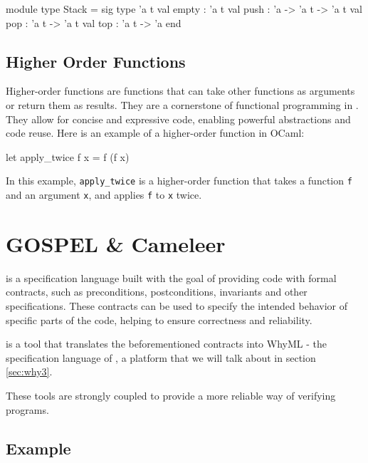 \begin{ocamlenv}
    module type Stack = sig
        type 'a t
        val empty : 'a t
        val push : 'a -> 'a t -> 'a t
        val pop : 'a t -> 'a t
        val top : 'a t -> 'a
    end
\end{ocamlenv}

\subsection{Higher Order Functions}
\label{sub:higher_order_functions}

Higher-order functions are functions that can take other functions as arguments 
or return them as results. They are a cornerstone of functional programming in \ocaml.
They allow 
for concise and expressive code, enabling powerful abstractions and code reuse. 
Here is an example of a higher-order function in OCaml:

\begin{ocamlenv}
    let apply_twice f x = f (f x)
\end{ocamlenv}

In this example, \texttt{apply\_twice} is a higher-order function that takes a function 
\texttt{f} and an argument \texttt{x}, and applies \texttt{f} to \texttt{x} twice.

\section{GOSPEL \& Cameleer}
\label{sec:gospel_and_cameleer}

\gospellang is a specification language built with the goal of providing \ocaml code 
with formal contracts, such as preconditions, postconditions, invariants and other 
specifications. These contracts can be used to specify the intended behavior of 
specific parts of the code, helping to ensure correctness and reliability.

\cameleer is a tool that translates the beforementioned contracts into WhyML - 
the specification language of \why, a platform that we will talk about in 
section \ref{sec:why3}.

These tools are strongly coupled to provide a more reliable way of verifying 
\ocaml programs.

\subsection{Example}
\label{sub:example}


